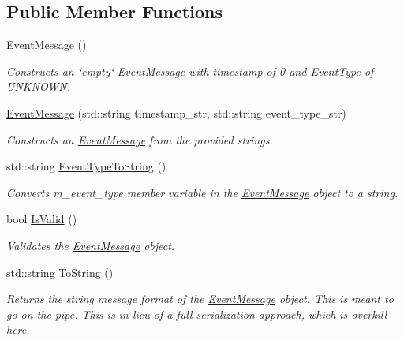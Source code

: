 \subsection*{Public Member Functions}
\begin{DoxyCompactItemize}
\item 
\mbox{\label{classEventMessage_a1af65b34ed2337c476357d1e8c666308}} 
\mbox{\hyperlink{classEventMessage_a1af65b34ed2337c476357d1e8c666308}{Event\+Message}} ()
\begin{DoxyCompactList}\small\item\em Constructs an \char`\"{}empty\char`\"{} \mbox{\hyperlink{classEventMessage}{Event\+Message}} with timestamp of 0 and Event\+Type of U\+N\+K\+N\+O\+WN. \end{DoxyCompactList}\item 
\mbox{\hyperlink{classEventMessage_ae9314c9140aec416b1e403c2ec3dad25}{Event\+Message}} (std\+::string timestamp\+\_\+str, std\+::string event\+\_\+type\+\_\+str)
\begin{DoxyCompactList}\small\item\em Constructs an \mbox{\hyperlink{classEventMessage}{Event\+Message}} from the provided strings. \end{DoxyCompactList}\item 
std\+::string \mbox{\hyperlink{classEventMessage_a3dd4a7325fcc39e7cfdf2365422ae1c7}{Event\+Type\+To\+String}} ()
\begin{DoxyCompactList}\small\item\em Converts m\+\_\+event\+\_\+type member variable in the \mbox{\hyperlink{classEventMessage}{Event\+Message}} object to a string. \end{DoxyCompactList}\item 
bool \mbox{\hyperlink{classEventMessage_aa5356a869ca843577b6af64f5c1c9297}{Is\+Valid}} ()
\begin{DoxyCompactList}\small\item\em Validates the \mbox{\hyperlink{classEventMessage}{Event\+Message}} object. \end{DoxyCompactList}\item 
std\+::string \mbox{\hyperlink{classEventMessage_ae13342857432d5274f4d86ecc87cb613}{To\+String}} ()
\begin{DoxyCompactList}\small\item\em Returns the string message format of the \mbox{\hyperlink{classEventMessage}{Event\+Message}} object. This is meant to go on the pipe. This is in lieu of a full serialization approach, which is overkill here. \end{DoxyCompactList}\end{DoxyCompactItemize}
